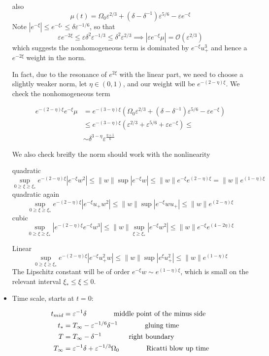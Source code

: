 \documentclass[letterpaper,11pt]{article}
\newcommand{\rmO}{\mathcal{O}}
\newcommand{\eps}{\varepsilon}
\numberwithin{equation}{section}
\theoremstyle{plain}
\begin{document}
\begin{itemize}
also
\[
\mu(t)=\Omega_0\eps^{2/3} +(\delta-\delta^{-1})\eps^{5/6}-\eps e^{-\xi}
\]
Note $|e^{-\xi} | \le e^{-\xi_*} \le \delta \eps^{-1/6}$, so that
\[
\eps e^{-2\xi} \le \eps\delta^2\eps^{-1/3} \le \delta^2\eps^{2/3}  \implies |\eps e^{-\xi}\mu| =\rmO(\eps^{2/3})
\]
which suggests the nonhomogeneous term is dominated by $e^{-\xi}u_+^3$ and hence a $e^{-2\xi}$ weight in the norm.

In fact, due to the resonance of $e^{2\xi}$ with the linear part, we need to choose a slightly weaker norm, let $\eta \in (0,1)$, and our weight will be $e^{-(2-\eta)\xi}$.
We check the nonhomogeneous term

\begin{align*}
e^{-(2-\eta)\xi} e^{-\xi}\mu &=e^{-(3-\eta)\xi} (\Omega_0 \eps^{2/3} + (\delta-\delta^{-1})\eps^{5/6}-\eps e^{-\xi} )\\
& \le e^{-(3-\eta)\xi} (\eps^{2/3}+\eps^{5/6}+\eps e^{-\xi}) \le  \\
&\sim \delta^{3-\eta}\eps^{\frac{\eta+1}{6}}
\end{align*}


We also check breifly the norm should work with the nonlinearity

quadratic
\[
\sup_{0\ge \xi\ge \xi_*} e^{-(2-\eta)\xi}|e^{-\xi}w^2| \le \|w\|\sup |e^{-\xi}w| \le \|w\| e^{-\xi}e^{(2-\eta)\xi} =\|w\|e^{(1-\eta)\xi}
\]
quadratic again
\[
\sup_{0\ge \xi\ge \xi_*} e^{-(2-\eta)\xi}|e^{-\xi}u_+w^2|\le \|w\| \sup |e^{-\xi}w u_+| \le \|w\|e^{(2-\eta)\xi}
\]
cubic
\[
\sup_{0\ge \xi\ge \xi_*} |e^{-(2-\eta)\xi}e^{-\xi}w^3| \le \|w\|\sup_{\xi \ge \xi_*} |e^{-\xi} w^2| \le \|w\| e^{-\xi}e^{(4-2\eta)\xi}
\]

Linear
\[
\sup_{0\ge \xi\ge \xi_*} e^{-(2-\eta)\xi}|e^{-\xi}u_+^2w| \le \|w\| \sup |e^{\xi}u_+^2| \le \|w\|e^{(1-\eta)\xi}
\]
The Lipschitz constant will be of order $e^{-\xi}w \sim e^{(1-\eta)\xi}$, which is small on the relevant interval $\xi_* \le \xi \le 0$.

\item Time scale, starts at $t=0$:

\begin{align*}
t_{mid} &= \eps^{-1}\delta  \hspace{0.5in} \text{ middle point of the minus side}\\
t_* &=  T_\infty - \eps^{-1/6}\delta^{-1} \hspace{0.5in} \text{ gluing time}\\
T & = T_\infty - \delta^{-1} \hspace{0.5in} \text{ right boundary  }\\
T_{\infty} &= \eps^{-1}\delta + \eps^{-1/3}\Omega_0 \hspace{0.5in}  \text{ Ricatti blow up time}
\end{align*}
\pagebreak

\end{itemize}
\end{document}
